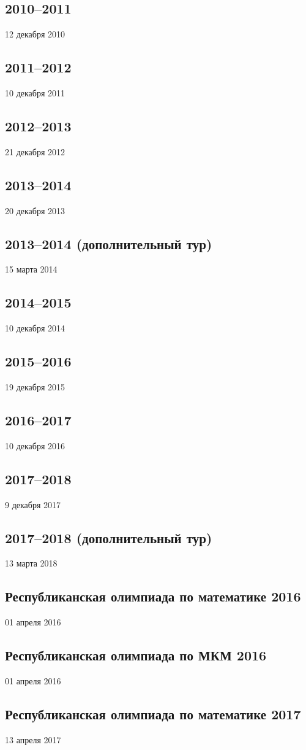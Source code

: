 \documentclass[12pt, a5paper]{article}
\newcommand{\header}[2]
{
	\subsection{{#1}}
	\begin{center}
	#2
	\end{center}
}
\begin{document}
\header{2010--2011}{12 декабря 2010}

\newpage

\header{2011--2012}{10 декабря 2011}

\newpage

\header{2012--2013}{21 декабря 2012}

\newpage

\header{2013--2014}{20 декабря 2013}

\newpage

\header{2013--2014 (дополнительный тур)}{15 марта 2014}

\newpage

\header{2014--2015}{10 декабря 2014}

\newpage

\header{2015--2016}{19 декабря 2015}

\newpage

\header{2016--2017}{10 декабря 2016}

\newpage

\header{2017--2018}{9 декабря 2017}

\newpage

\header{2017--2018 (дополнительный тур)}{13 марта 2018}

\newpage

\header{Республиканская олимпиада по математике 2016}{01 апреля 2016}

\newpage

\header{Республиканская олимпиада по МКМ 2016}{01 апреля 2016}

\newpage

\header{Республиканская олимпиада по математике 2017}{13 апреля 2017}

\newpage

\end{document}
